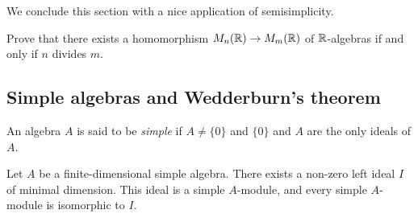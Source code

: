 We conclude this section with a nice
application of semisimplicity.

\begin{bonus}
	\label{xca:matrices}
	Prove that there exists a 
	homomorphism $M_n(\mathbb{R})\to M_m(\mathbb{R})$ of $\mathbb{R}$-algebras 
	if and only 
	if $n$ divides $m$. 
\end{bonus}




\subsection{Simple algebras and Wedderburn's theorem}

\begin{definition}
    An algebra $A$ is said to be \emph{simple} if $A\ne\{0\}$ and $\{0\}$ and $A$ are the only ideals of $A$. 
\end{definition}

\begin{proposition}
	Let $A$ be a finite-dimensional simple algebra. There exists a non-zero left ideal 
	$I$ of minimal dimension. This ideal is a simple 
	$A$-module, and every simple $A$-module is isomorphic to $I$.
\end{proposition}

